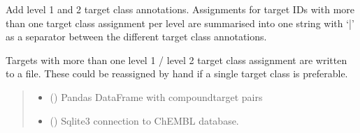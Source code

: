 \documentclass[letterpaper,10pt,english]{sphinxmanual}
\begin{document}
\begin{fulllineitems}
\label{\detokenize{add_chembl_target_class_annotations:add_chembl_target_class_annotations.add_chembl_target_class_annotations}}
\pysigstartsignatures
{}
\pysigstopsignatures
\sphinxAtStartPar
Add level 1 and 2 target class annotations.
Assignments for target IDs with more than one target class assignment per level
are summarised into one string with ‘|’ as a separator between the different target class annotations.

\sphinxAtStartPar
Targets with more than one level 1 / level 2 target class assignment are written to a file.
These could be reassigned by hand if a single target class is preferable.
\begin{quote}\begin{description}
\begin{itemize}
\item {} 
\sphinxAtStartPar
{} () \textendash{} Pandas DataFrame with compound\sphinxhyphen{}target pairs

\item {} 
\sphinxAtStartPar
{} () \textendash{} Sqlite3 connection to ChEMBL database.


\end{itemize}
\end{description}
\end{quote}
\end{fulllineitems}
\end{document}
